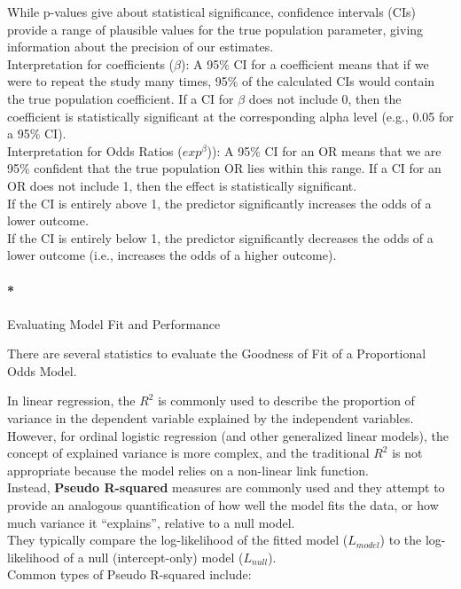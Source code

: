 \documentclass[
  letterpaper,
  DIV=11,
  numbers=noendperiod]{scrartcl}
\let\oldparagraph\paragraph
\renewcommand{\paragraph}[1]{\oldparagraph{#1}\mbox{}}
\begin{document}
While p-values give about statistical significance, confidence intervals
(CIs) provide a range of plausible values for the true population
parameter, giving information about the precision of our estimates.\\
Interpretation for coefficients (\(\beta\)): A 95\% CI for a coefficient
means that if we were to repeat the study many times, 95\% of the
calculated CIs would contain the true population coefficient. If a CI
for \(\beta\) does not include 0, then the coefficient is statistically
significant at the corresponding alpha level (e.g., 0.05 for a 95\%
CI).\\
Interpretation for Odds Ratios (\(exp^\beta\))): A 95\% CI for an OR
means that we are 95\% confident that the true population OR lies within
this range. If a CI for an OR does not include 1, then the effect is
statistically significant.\\
If the CI is entirely above 1, the predictor significantly increases the
odds of a lower outcome.\\
If the CI is entirely below 1, the predictor significantly decreases the
odds of a lower outcome (i.e., increases the odds of a higher outcome).

\hypertarget{evaluating-model-fit-and-performance}{%
\paragraph*{Evaluating Model Fit and
Performance}\label{evaluating-model-fit-and-performance}}

There are several statistics to evaluate the Goodness of Fit of a
Proportional Odds Model.

In linear regression, the \(R^2\) is commonly used to describe the
proportion of variance in the dependent variable explained by the
independent variables. However, for ordinal logistic regression (and
other generalized linear models), the concept of explained variance is
more complex, and the traditional \(R^2\) is not appropriate because the
model relies on a non-linear link function.\\
Instead, \textbf{Pseudo R-squared} measures are commonly used and they
attempt to provide an analogous quantification of how well the model
fits the data, or how much variance it ``explains'', relative to a null
model.\\
They typically compare the log-likelihood of the fitted model
(\(L_{model}\)) to the log-likelihood of a null (intercept-only) model
(\(L_{null}\)).\\
Common types of Pseudo R-squared include:
\end{document}
